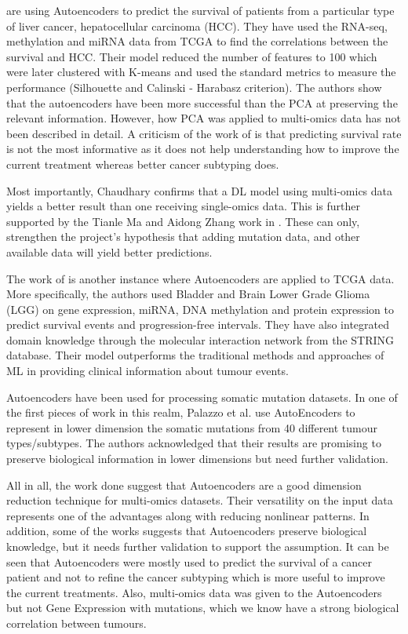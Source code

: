 \citet{Chaudhary2018-qj} are using Autoencoders to predict the survival of patients from a particular type of liver cancer, hepatocellular carcinoma (HCC). They have used the RNA-seq, methylation and miRNA data from TCGA to find the correlations between the survival and HCC. Their model reduced the number of features to 100 which were later clustered with K-means and used the standard metrics to measure the performance (Silhouette and Calinski - Harabasz criterion). The authors show that the autoencoders have been more successful than the PCA at preserving the relevant information. However, how PCA was applied to multi-omics data has not been described in detail. A criticism of the work of \citet{Chaudhary2018-qj} is that predicting survival rate is not the most informative as it does not help understanding how to improve the current treatment whereas better cancer subtyping does.

Most importantly, Chaudhary confirms that a DL model using multi-omics data yields a better result than one receiving single-omics data. This is further supported by the Tianle Ma and Aidong Zhang work in \cite{Ma2019-hk}. These can only, strengthen the project's hypothesis that adding mutation data, and other available data will yield better predictions.

The work of \citet{Ma2019-hk} is another instance where Autoencoders are applied to TCGA data. More specifically, the authors used Bladder and Brain Lower Grade Glioma (LGG) on gene expression, miRNA, DNA methylation and protein expression to predict survival events and progression-free intervals. They have also integrated domain knowledge through the molecular interaction network from the STRING database. Their model outperforms the traditional methods and approaches of ML in providing clinical information about tumour events.

Autoencoders have been used for processing somatic mutation datasets. In one of the first pieces of work in this realm, Palazzo et al. \cite{Palazzo2019-hx} use AutoEncoders to represent in lower dimension the somatic mutations from 40 different tumour types/subtypes. The authors acknowledged that their results are promising to preserve biological information in lower dimensions but need further validation.


All in all, the work done suggest that Autoencoders are a good dimension reduction technique for multi-omics datasets. Their versatility on the input data represents one of the advantages along with reducing nonlinear patterns. In addition, some of the works suggests that Autoencoders preserve biological knowledge, but it needs further validation to support the assumption. It can be seen that Autoencoders were mostly used to predict the survival of a cancer patient and not to refine the cancer subtyping which is more useful to improve the current treatments. Also, multi-omics data was given to the Autoencoders but not Gene Expression with mutations, which we know have a strong biological correlation between tumours.


